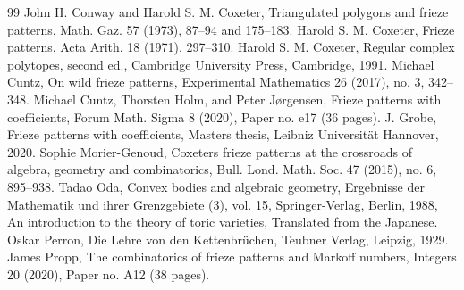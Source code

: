 \documentclass[10pt]{amsart}
\numberwithin{equation}{section}
\theoremstyle{definition}
\theoremstyle{remark}
\begin{document}
\begin{thebibliography}{99}
 John H. Conway and Harold S. M. Coxeter, Triangulated polygons and frieze patterns, Math. Gaz. 57 (1973), 87--94 and 175--183.
 Harold S. M. Coxeter, Frieze patterns, Acta Arith. 18 (1971), 297--310.
 Harold S. M. Coxeter, Regular complex polytopes, second ed., Cambridge University Press, Cambridge, 1991.
 Michael Cuntz, On wild frieze patterns, Experimental Mathematics 26 (2017), no. 3, 342--348.
 Michael Cuntz, Thorsten Holm, and Peter J\o rgensen, Frieze patterns with coefficients, Forum Math. Sigma 8 (2020), Paper no. e17 (36 pages).
 J. Grobe, Frieze patterns with coefficients, Master\textquotesingle s thesis, Leibniz Universit\"at Hannover, 2020.
 Sophie Morier-Genoud, Coxeter\textquotesingle s frieze patterns at the crossroads of algebra, geometry and combinatorics, Bull. Lond. Math. Soc. 47 (2015), no. 6, 895--938.
 Tadao Oda, Convex bodies and algebraic geometry, Ergebnisse der Mathematik und ihrer Grenzgebiete (3), vol. 15, Springer-Verlag, Berlin, 1988, An introduction to the theory of toric varieties, Translated from the Japanese.
 Oskar Perron, Die Lehre von den Kettenbr\"uchen, Teubner Verlag, Leipzig, 1929.
 James Propp, The combinatorics of frieze patterns and Markoff numbers, Integers 20 (2020), Paper no. A12 (38 pages).
\end{thebibliography}
\end{document}
